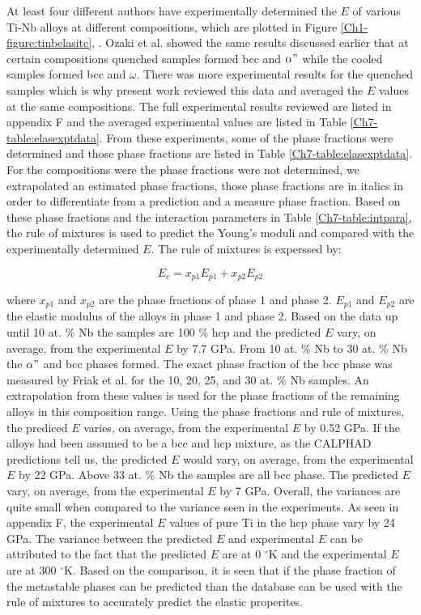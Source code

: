 At least four different authors have experimentally determined the $E$ of various Ti-Nb alloys at different compositions, which are plotted in Figure \ref{Ch1-figure:tinbelasitc}, \cite{Friak2012,Timoshevskii2011,Friak2012,Karre2015}. Ozaki et al. \cite{Ozaki2004} showed the same results discussed earlier that at certain compositions quenched samples formed bcc and $\alpha"$ while the cooled samples formed bcc and $\omega$. There was more experimental results for the quenched samples which is why present work reviewed this data and averaged the $E$ values at the same compositions. The full experimental results reviewed are listed in appendix F and the averaged experimental values are listed in Table \ref{Ch7-table:elasexptdata}. From these experiments, some of the phase fractions were determined \cite{Friak2012} and those phase fractions are listed in Table \ref{Ch7-table:elasexptdata}. For the compositions were the phase fractions were not determined, we extrapolated an estimated phase fractions, those phase fractions are in italics in order to differentiate from a prediction and a measure phase fraction.  Based on these phase fractions and the interaction parameters in Table \ref{Ch7-table:intpara}, the rule of mixtures is used to predict the Young's moduli and compared with the experimentally determined $E$. The rule of mixtures is experssed by: 

\begin{equation}
\label{eq:ruleofmix}
E_{c}=x_{p1}E_{p1}+x_{p2}E_{p2}
\end{equation}

\noindent where $x_{p1}$ and $x_{p2}$ are the phase fractions of phase 1 and phase 2. $E_{p1}$ and $E_{p2}$ are the elastic modulus of the alloys in phase 1 and phase 2. Based on the data up until 10 at. \% Nb the samples are 100 \% hcp and the predicted $E$ vary, on average, from the experimental $E$ by 7.7 GPa. From 10 at. \% Nb to 30 at. \% Nb the $\alpha"$ and bcc phases formed. The exact phase fraction of the bcc phase was measured by Friak et al. for the 10, 20, 25, and 30 at. \% Nb samples. An extrapolation from these values is used for the phase fractions of the remaining alloys in this composition range. Using the phase fractions and rule of mixtures, the prediced $E$ varies, on average, from the experimental $E$ by 0.52 GPa. If the alloys had been assumed to be a bcc and hcp mixture, as the CALPHAD predictions tell us, the predicted $E$ would vary, on average, from the experimental $E$ by 22 GPa. Above 33 at. \% Nb the samples are all bcc phase. The predicted $E$ vary, on average, from the experimental $E$ by 7 GPa. Overall, the variances are quite small when compared to the variance seen in the experiments. As seen in appendix F, the experimental $E$ values of pure Ti in the hcp phase vary by 24 GPa. The variance between the predicted $E$ and experimental $E$ can be attributed to the fact that the predicted $E$ are at 0 $^\circ$K and the experimental $E$ are at 300 $^\circ$K. Based on the comparison, it is seen that if the phase fraction of the metastable phases can be predicted than the database can be used with the rule of mixtures to accurately predict the elastic properites. 

